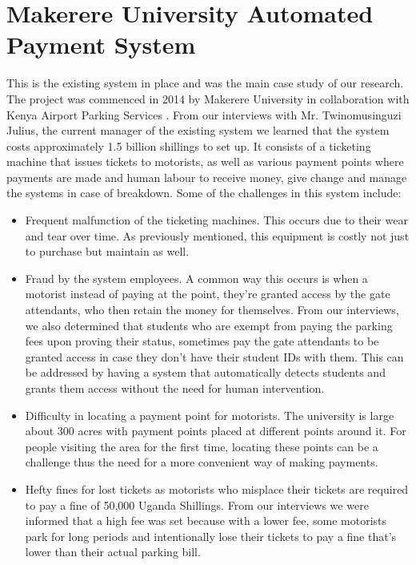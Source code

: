 \clearpage


\section{Makerere University Automated Payment System}
This is the existing system in place and was the main case study of our research. The project was commenced in 2014 by Makerere University in collaboration with Kenya Airport Parking Services\cite{wamai_mak_2014} .
From our interviews with Mr. Twinomusinguzi Julius, the current manager of the existing system we learned that the system costs approximately 1.5 billion shillings to set up. It consists of a ticketing machine that issues tickets to motorists, as well as various payment points where payments are made and human labour to receive money, give change and manage the systems in case of breakdown. Some of the challenges in this system include:

\begin{itemize}
    \item Frequent malfunction of the ticketing machines. This occurs due to their wear and tear over time. As previously mentioned, this equipment is costly not just to purchase but maintain as well.
    \item Fraud by the system employees. A common way this occurs is when a motorist instead of paying at the point, they're granted access by the gate attendants, who then retain the money for themselves. From our interviews, we also determined that students who are exempt from paying the parking fees upon proving their status, sometimes pay the gate attendants to be granted access in case they don't have their student IDs with them. This can be addressed by having a system that automatically detects students and grants them access without the need for human intervention.
    \item Difficulty in locating a payment point for motorists. The university is large about 300 acres with payment points placed at different points around it. For people visiting the area for the first time, locating these points can be a challenge thus the need for a more convenient way of making payments.
    \item Hefty fines for lost tickets as motorists who misplace their tickets are required to pay a fine of 50,000 Uganda Shillings. From our interviews we were informed that a high fee was set because with a lower fee, some motorists park for long periods and intentionally lose their tickets to pay a fine that's lower than their actual parking bill.
\end{itemize}


